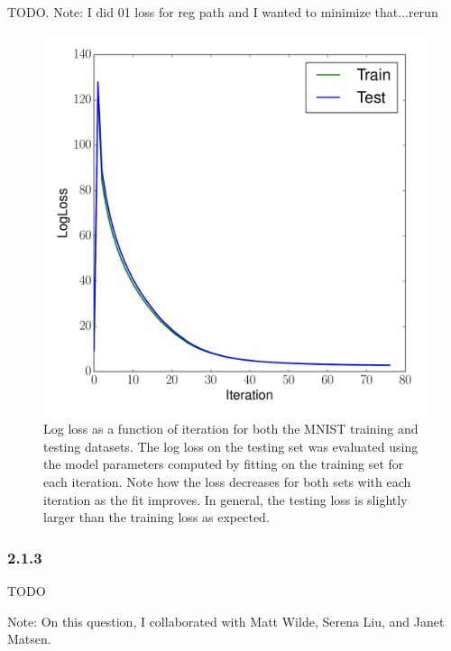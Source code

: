 \documentclass[12pt]{amsart}
\begin{document}
TODO.  Note: I did 01 loss for reg path and I wanted to minimize that...rerun 

\begin{figure}[H]
	\includegraphics[width=\columnwidth]{mnist_train_test_ll.pdf}
    \caption{Log loss as a function of iteration for both the MNIST training and testing datasets.  The log loss on the testing set was evaluated using the model parameters computed by fitting on the training set for each iteration.  Note how the loss decreases for both sets with each iteration as the fit improves.  In general, the testing loss is slightly larger than the training loss as expected.}
    \label{fig:mnist_ll}
\end{figure}

\subsubsection*{2.1.3}
TODO

Note: On this question, I collaborated with Matt Wilde, Serena Liu, and Janet Matsen.
\end{document}
